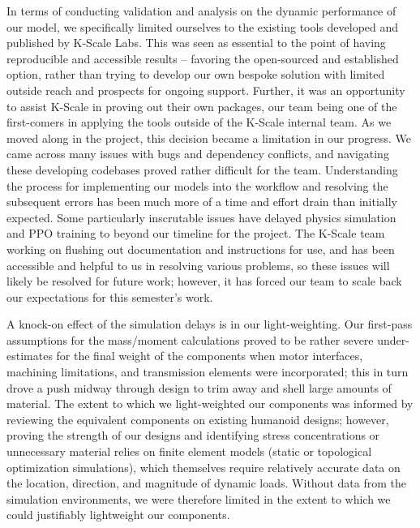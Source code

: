 \documentclass{article}
\begin{document}
In terms of conducting validation and analysis on the dynamic performance of our model, we specifically limited ourselves to the existing tools developed and published by K-Scale Labs. This was seen as essential to the point of having reproducible and accessible results -- favoring the open-sourced and established option, rather than trying to develop our own bespoke solution with limited outside reach and prospects for ongoing support. Further, it was an opportunity to assist K-Scale in proving out their own packages, our team being one of the first-comers in applying the tools outside of the K-Scale internal team. As we moved along in the project, this decision became a limitation in our progress. We came across many issues with bugs and dependency conflicts, and navigating these developing codebases proved rather difficult for the team. Understanding the process for implementing our models into the workflow and resolving the subsequent errors has been much more of a time and effort drain than initially expected. Some particularly inscrutable issues have delayed physics simulation and PPO training to beyond our timeline for the project. The K-Scale team working on flushing out documentation and instructions for use, and has been accessible and helpful to us in resolving various problems, so these issues will likely be resolved for future work; however, it has forced our team to scale back our expectations for this semester's work.

A knock-on effect of the simulation delays is in our light-weighting. Our first-pass assumptions for the mass/moment calculations proved to be rather severe under-estimates for the final weight of the components when motor interfaces, machining limitations, and transmission elements were incorporated; this in turn drove a push midway through design to trim away and shell large amounts of material. The extent to which we light-weighted our components was informed by reviewing the equivalent components on existing humanoid designs; however, proving the strength of our designs and identifying stress concentrations or unnecessary material relies on finite element models (static or topological optimization simulations), which themselves require relatively accurate data on the location, direction, and magnitude of dynamic loads. Without data from the simulation environments, we were therefore limited in the extent to which we could justifiably lightweight our components.  
\end{document}
